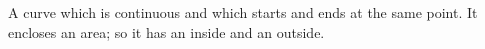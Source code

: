 A curve which is continuous and which starts and 
ends at the same point.
It encloses an area; so it has 
an inside and an outside.